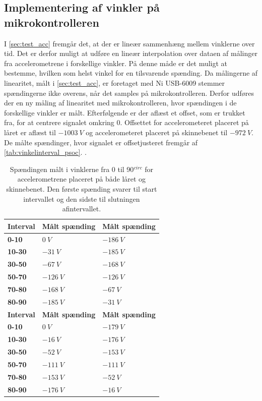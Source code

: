 \subsection{Implementering af vinkler på mikrokontrolleren}\label{sec:imp_vinkler}
I \autoref{sec:test_acc} fremgår det, at der er lineær sammenhæng mellem vinklerne over tid. Det er derfor muligt at udføre en lineær interpolation over dataen af målinger fra accelerometrene i forskellige vinkler. På denne måde er det muligt at bestemme, hvilken som helst vinkel for en tilsvarende spænding. Da målingerne af linearitet, målt i \autoref{sec:test_acc}, er foretaget med Ni USB-6009 stemmer spændingerne ikke overens, når det samples på mikrokontrolleren. Derfor udføres der en ny måling af linearitet med mikrokontrolleren, hvor spændingen i de forskellige vinkler er målt. Efterfølgende er der aflæst et offset, som er trukket fra, for at centrere signalet omkring 0. Offsettet for accelerometeret placeret på låret er aflæst til $-1003~V$ og accelerometeret placeret på skinnebenet til $-972~V$. De målte spændinger, hvor signalet er offsetjusteret fremgår af \autoref{tab:vinkelinterval_psoc}. .

\begin{table}[H]
	\centering
	\begin{tabular}{|l|l|l|}
	\textbf{Interval} & \textbf{Målt spænding} & \textbf{Målt spænding} 	\\ \hline	
    \textbf{0-10} 			& $0~V$							& $-186~V$   \\ \hline
    \textbf{10-30} 			& $-31~V$						& $-185~V$	\\ \hline
    \textbf{30-50} 			& $-67~V$						& $-168~V$	\\ \hline
    \textbf{50-70} 			& $-126~V$						& $-126~V$	\\ \hline
    \textbf{70-80} 			& $-168~V$						& $-67~V$	\\ \hline
    \textbf{80-90} 			& $-185~V$						& $-31~V$	\\ \hline
    	\textbf{Interval} & \textbf{Målt spænding} & \textbf{Målt spænding} 		\\ \hline	
    \textbf{0-10}			& $0~V$ 							& $-179~V$	    \\ \hline
    \textbf{10-30}			& $-16~V$						& $-176~V$	 	\\ \hline
    \textbf{30-50}			& $-52~V$						& $-153~V$		\\ \hline
    \textbf{50-70}			& $-111~V$						& $-111~V$		\\ \hline
    \textbf{70-80}			& $-153~V$						& $-52~V$	 	\\ \hline
     \textbf{80-90}			& $-176~V$						& $-16~V$	 	\\ \hline
	\end{tabular}
	\caption{Spændingen målt i vinklerne fra 0 til 90$^{circ}$ for accelerometrene placeret på både låret og skinnebenet. Den første spænding svarer til start intervallet og den sidste til slutningen afintervallet.}
	\label{tab:vinkelinterval_psoc}
\end{table}

